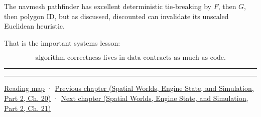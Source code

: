 The navmesh pathfinder has excellent deterministic tie-breaking by \(F\), then \(G\), then polygon ID, but as discussed, discounted  can invalidate its unscaled Euclidean heuristic.

That is the important systems lesson:

\[
\boxed{
\text{algorithm correctness lives in data contracts as much as code}.
}
\]

\begin{center}\rule{0.5\linewidth}{0.5pt}\end{center}

\begin{center}\rule{0.5\linewidth}{0.5pt}\end{center}

\hyperref[volume-reading-map]{Reading map} · \href{../05-Spatial-Worlds-Engine-State-and-Simulation-P02/main.pdf\#nameddest=06-engine-ii-ch029-dynamic-spatial-indices-for-moving-worlds}{Previous chapter (Spatial Worlds, Engine State, and Simulation, Part 2, Ch. 20)} · \href{../05-Spatial-Worlds-Engine-State-and-Simulation-P02/main.pdf\#nameddest=06-engine-ii-ch031-spatial-index-serialization-and-query-evidence}{Next chapter (Spatial Worlds, Engine State, and Simulation, Part 2, Ch. 21)}

